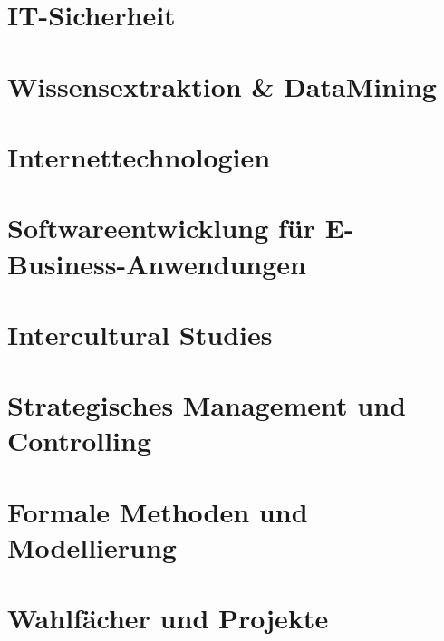 \documentclass{hswbook}
\begin{document}
    \chapter{IT-Sicherheit}
    \chapter{Wissensextraktion \& DataMining}
    \chapter{Internettechnologien}
    \chapter{Softwareentwicklung für E-Business-Anwendungen}
    \chapter{Intercultural Studies}
    \chapter{Strategisches Management und Controlling}
    \chapter{Formale Methoden und Modellierung}
    \chapter{Wahlfächer und Projekte}
\end{document}
